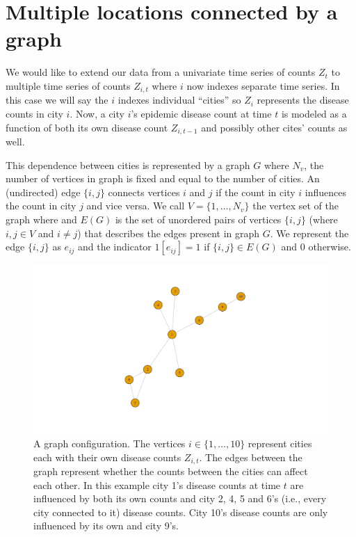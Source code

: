 \documentclass[11pt,a4paper]{article}
\begin{document}
\hypertarget{multiple-locations-connected-by-a-graph}{%
\section{Multiple locations connected by a
graph}\label{multiple-locations-connected-by-a-graph}}

We would like to extend our data from a univariate time series of counts
\(Z_t\) to multiple time series of counts \(Z_{i,t}\) where \(i\) now
indexes separate time series. In this case we will say the \(i\) indexes
individual ``cities'' so \(Z_i\) represents the disease counts in city
\(i\). Now, a city \(i\)'s epidemic disease count at time \(t\) is
modeled as a function of both its own disease count \(Z_{i,t-1}\) and
possibly other cites' counts as well.

This dependence between cities is represented by a graph \(G\) where
\(N_v\), the number of vertices in graph is fixed and equal to the
number of cities. An (undirected) edge \(\{i,j\}\) connects vertices
\(i\) and \(j\) if the count in city \(i\) influences the count in city
\(j\) and vice versa. We call \(V = \{1,\dots,N_v \}\) the vertex set of
the graph where and \(E(G)\) is the set of unordered pairs of vertices
\(\{i,j\}\) (where \(i,j \in V\) and \(i \neq j\)) that describes the
edges present in graph \(G\). We represent the edge \(\{i,j\}\) as
\(e_{ij}\) and the indicator \(1[e_{ij}]=1\) if \(\{i,j\} \in E(G)\) and
0 otherwise.

\begin{figure}
\includegraphics[trim={1 2cm 0 2cm},clip]{thesis_draft_files/figure-latex/unnamed-chunk-1-1} \caption{\label{fig:graph example} A graph configuration. The vertices $i \in \{1,\dots, 10\}$ represent cities each with their own disease counts $Z_{i,t}$. The edges between the graph represent whether the counts between the cities can affect each other. In this example city 1's disease counts at time $t$ are influenced by both its own counts and city 2, 4, 5 and 6's (i.e., every city connected to it) disease counts. City 10's disease counts are only influenced by its own and city 9's.}\label{fig:unnamed-chunk-1}
\end{figure}
\end{document}
